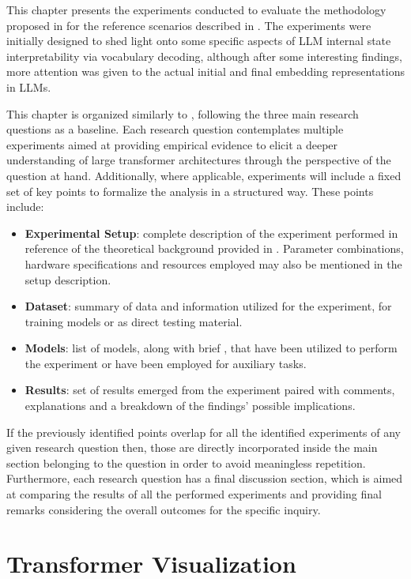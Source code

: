 This chapter presents the experiments conducted to evaluate the methodology proposed in  for the reference scenarios described in .
The experiments were initially designed to shed light onto some specific aspects of LLM internal state interpretability via vocabulary decoding, although after some interesting findings, more attention was given to the actual initial and final embedding representations in LLMs.

This chapter is organized similarly to , following the three main research questions as a baseline.
Each research question contemplates multiple experiments aimed at providing empirical evidence to elicit a deeper understanding of large transformer architectures through the perspective of the question at hand.
Additionally, where applicable, experiments will include a fixed set of key points to formalize the analysis in a structured way.
These points include:
\begin{itemize}
    \item \textbf{Experimental Setup}: complete description of the experiment performed in reference of the theoretical background provided in .
Parameter combinations, hardware specifications and resources employed may also be mentioned in the setup description.
    \item \textbf{Dataset}: summary of data and information utilized for the experiment,  for training models or as direct testing material.
    \item \textbf{Models}: list of models, along with brief , that have been utilized to perform the experiment or have been employed for auxiliary tasks. 
    \item \textbf{Results}: set of results emerged from the experiment paired with comments, explanations and a breakdown of the findings' possible implications.
\end{itemize}
If the previously identified points overlap for all the identified experiments of any given research question then, those are directly incorporated inside the main section belonging to the question in order to avoid meaningless repetition.
Furthermore, each research question has a final discussion section, which is aimed at comparing the results of all the performed experiments and providing final remarks considering the overall outcomes for the specific inquiry.

\section{Transformer Visualization}\label{sec:exp_intravisto}

